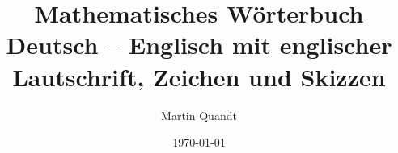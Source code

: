 \newenvironment{lesen}{%
	\begin{longtable}{@{}>{\raggedright\arraybackslash}p{4.6cm} >{\raggedright\arraybackslash}p{12.1cm}@{}}}{%
	\end{longtable}\vspace{-1.2em}}

\newcommand{\anmerkung}[1]{\par\smallskip\noindent{\small\sloppy\textbf{Hinweis:} #1\par}\smallskip}

\newcommand{\randpunkt}[2]{\if#1g\fill[blue] (#2,0) circle (3.2pt);\else\filldraw[fill=white, draw=blue, very thick] (#2,0) circle (3.2pt);\fi}
\newcommand{\intervall}[2]{\tikz[baseline=-0.6ex, scale=0.6]{\draw[achse] (-0.3,0) -- (5.6,0);
	\draw[blue, line width=2pt] (1,0) -- (4,0); \randpunkt{#1}{1} \randpunkt{#2}{4};
	\node[below=2pt, font=\scriptsize] at (1,0) {$a$}; \node[below=2pt, font=\scriptsize] at (4,0) {$b$};}}
\newcommand{\intervallR}{\tikz[baseline=-0.6ex, scale=0.6]{\draw[achse] (-0.3,0) -- (5.6,0);
	\draw[blue, line width=2pt, -{Stealth}] (1,0) -- (5.3,0); \randpunkt{g}{1};
	\node[below=2pt, font=\scriptsize] at (1,0) {$a$};}}

\newcommand{\ub}[3]{\underbrace{\text{\Large$#1$}}_{\text{\footnotesize\shortstack{#2\\\color{black!60}#3}}}}

\newcommand{\platz}{\par\ifdim\dimexpr\pagegoal-\pagetotal\relax<5.5cm \newpage\fi}


\title{Mathematisches Wörterbuch\\[0.3em] \large Deutsch -- Englisch mit englischer Lautschrift, Zeichen und Skizzen}
\author{Martin Quandt}
\date{\today}
\pagestyle{plain}
\setlength{\tabcolsep}{4pt}


